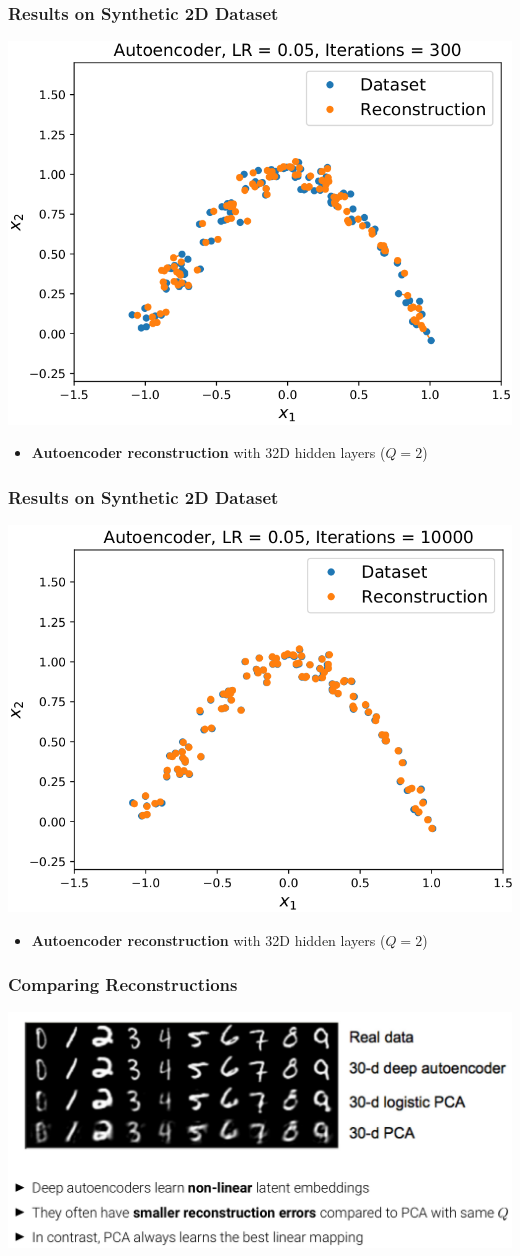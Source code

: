 \documentclass[10pt,aspectratio=169]{beamer}
\begin{document}
\begin{frame}
  \frametitle{Results on Synthetic 2D Dataset}
\begin{center}
\includegraphics[width=.5\textwidth]{images/s31}
\end{center}
\small{
\begin{itemize}
\item \textbf{Autoencoder reconstruction} with 32D hidden layers ($Q=2$)
\end{itemize}
}
\end{frame}

\begin{frame}
  \frametitle{Results on Synthetic 2D Dataset}
\begin{center}
\includegraphics[width=.5\textwidth]{images/s32}
\end{center}
\small{
\begin{itemize}
\item \textbf{Autoencoder reconstruction} with 32D hidden layers ($Q=2$)
\end{itemize}
}
\end{frame}

\begin{frame}
  \frametitle{Comparing Reconstructions}
\begin{center}
\includegraphics[width=.9\textwidth]{images/s33}
\end{center}
\end{frame}
\end{document}
